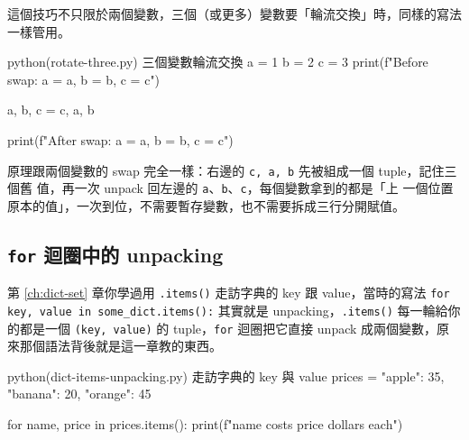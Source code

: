 

這個技巧不只限於兩個變數，三個（或更多）變數要「輪流交換」時，同樣的寫法一樣管用。

\begin{example}{python}{(rotate-three.py) 三個變數輪流交換}
a = 1
b = 2
c = 3
print(f"Before swap: a = {a}, b = {b}, c = {c}")

a, b, c = c, a, b

print(f"After swap: a = {a}, b = {b}, c = {c}")
\end{example}


原理跟兩個變數的 swap 完全一樣：右邊的 \texttt{c, a, b} 先被組成一個 tuple，記住三個舊
值，再一次 unpack 回左邊的 \texttt{a}、\texttt{b}、\texttt{c}，每個變數拿到的都是「上
一個位置原本的值」，一次到位，不需要暫存變數，也不需要拆成三行分開賦值。

\subsection*{\texttt{for} 迴圈中的 unpacking}

第 \ref{ch:dict-set} 章你學過用 \texttt{.items()} 走訪字典的 key 跟 value，當時的寫法
\texttt{for key, value in some\_dict.items():} 其實就是 unpacking，\texttt{.items()}
每一輪給你的都是一個 \texttt{(key, value)} 的 tuple，\texttt{for} 迴圈把它直接 unpack
成兩個變數，原來那個語法背後就是這一章教的東西。

\begin{example}{python}{(dict-items-unpacking.py) 走訪字典的 key 與 value}
prices = {"apple": 35, "banana": 20, "orange": 45}

for name, price in prices.items():
    print(f"{name} costs {price} dollars each")
\end{example}


